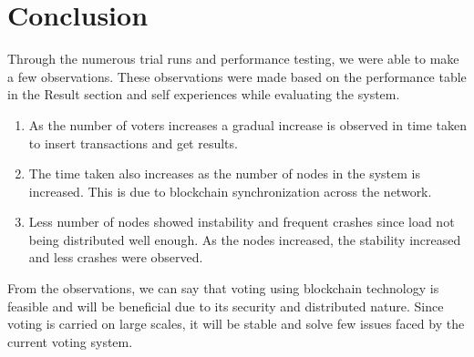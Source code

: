 \documentclass[10pt,final,journal,a4paper,oneside,twocolumn]{IEEEtran}
\begin{document}
	\section{Conclusion}
		Through the numerous trial runs and performance testing, we were able to make a few observations. These observations were made based on the performance table in the Result section and self experiences while evaluating the system.
		\begin{enumerate}
			\item As the number of voters increases a gradual increase is observed in time taken to insert transactions and get results.
			\item The time taken also increases as the number of nodes in the system is increased. This is due to blockchain synchronization across the network.
			\item Less number of nodes showed instability and frequent crashes since load not being distributed well enough. As the nodes increased, the stability increased and less crashes were observed.
		\end{enumerate}
		From the observations, we can say that voting using blockchain technology is feasible and will be beneficial due to its security and distributed nature. Since voting is carried on large scales, it will be stable and solve few issues faced by the current voting system.


	
	
\end{document}
